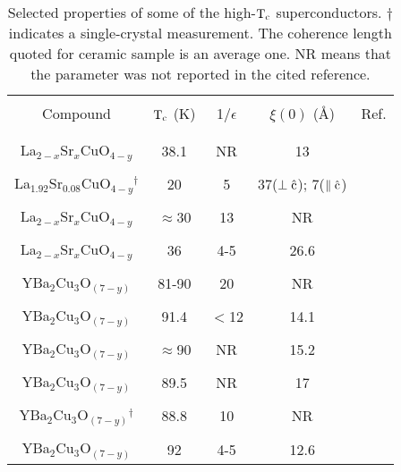 
\begin{table}
\begin{center}
\caption[Selected properties of some of the high-$\rm T_c$
superconductors]{Selected  properties  of  some   of  the   high-$\rm  T_c$
superconductors.  $\dagger$  indicates a  single-crystal  measurement.  The
coherence  length quoted  for ceramic sample  is an average  one.  NR means
that the parameter was not reported in the cited reference.}
\label{hitctable}
\begin{tabular}{|ccccc|}
\hline
& & & & \\
Compound& $\rm T_c$ (K)& 1/$\epsilon$ & $\xi(0)$ (\AA)& Ref. \\
& & & & \\
\hline
& & & & \\
La$_{2-x}$Sr$_x$CuO$_{4-y}$ & 38.1 & NR & 13 & \cite{orlando87b}\\
& & & & \\
La$_{1.92}$Sr$_{0.08}$CuO$_{4-y}$$^{\dagger}$ & 20  & 5 & 37($\rm \perp \hat{c}$); 7($\rm \parallel \hat{c}$) & \cite{iye88}\\
& & & & \\
La$_{2-x}$Sr$_x$CuO$_{4-y}$ & $\approx$30 & 13 & NR  & \cite{uchida87}\\
& & & & \\
La$_{2-x}$Sr$_x$CuO$_{4-y}$ & 36 & 4-5 & 26.6 & \cite{vanbentum87}\\
& & & & \\
YBa$_2$Cu$_3$O$_{(7-y)}$ & 81-90 & 20 & NR & \cite{mcguire87}\\
& & & & \\
YBa$_2$Cu$_3$O$_{(7-y)}$ & 91.4 & $<$12 & 14.1 & \cite{orlando87}\\
& & & & \\
YBa$_2$Cu$_3$O$_{(7-y)}$ & $\approx$90 & NR & 15.2 & \cite{rettori87}\\
& & & & \\
YBa$_2$Cu$_3$O$_{(7-y)}$ & 89.5 & NR & 17 & \cite{orlando87a}\\
& & & & \\
YBa$_2$Cu$_3$O$_{(7-y)}$$^{\dagger}$ & 88.8 &10  & NR & \cite{dinger87}\\
& & & & \\
YBa$_2$Cu$_3$O$_{(7-y)}$ & 92 & 4-5 & 12.6 & \cite{vanbentum87}\\

\end{tabular}
\end{center}
\end{table}
